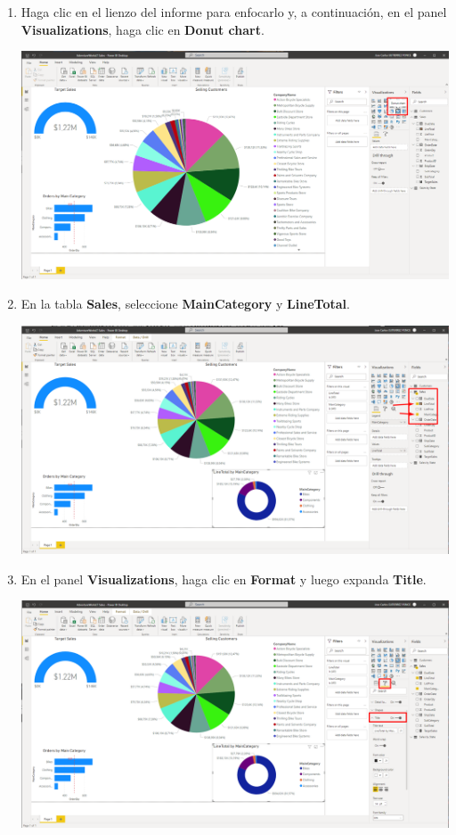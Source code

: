 \documentclass[12pt,letterpaper]{article}
\newcommand\tab[1][1cm]{\hspace*{#1}}
\begin{document}
\begin{enumerate}[\tab 1.]
\begin{center}
        \end{center}
        \item Haga clic en el lienzo del informe para enfocarlo y, a continuación, en el panel \textbf{Visualizations}, haga clic en \textbf{Donut chart}.
        \begin{center}
            \includegraphics[width=13cm]{./img/img99.png}
        \end{center}
        \item En la tabla \textbf{Sales}, seleccione \textbf{MainCategory} y \textbf{LineTotal}.
        \begin{center}
            \includegraphics[width=13cm]{./img/img100.png}
        \end{center}
        \item En el panel \textbf{Visualizations}, haga clic en \textbf{Format} y luego expanda \textbf{Title}.
        \begin{center}
            \includegraphics[width=13cm]{./img/img101.png}

\end{center}
\end{enumerate}
\end{document}
